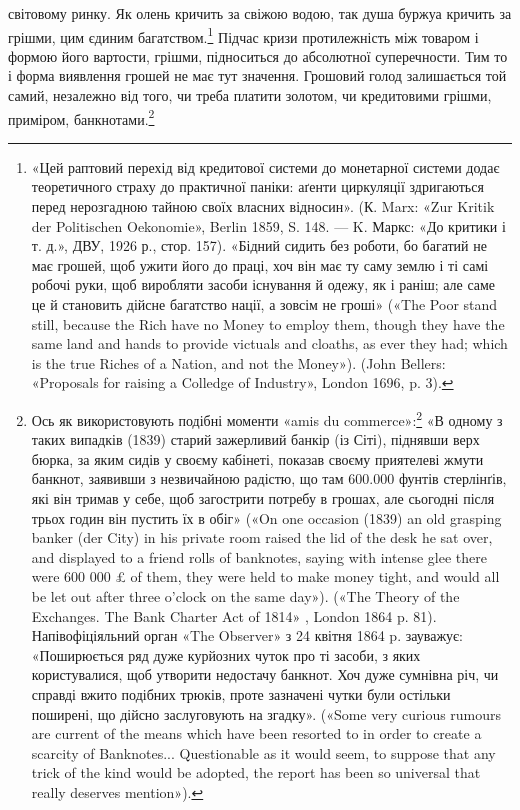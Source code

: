 \parcont{}  %
світовому ринку. Як олень кричить за свіжою водою, так душа буржуа кричить за грішми, цим єдиним
багатством.\footnote{
«Цей раптовий перехід від кредитової системи до монетарної системи додає теоретичного страху до
практичної паніки: аґенти циркуляції здригаються перед нерозгадною тайною своїх власних відносин».
(К. Marx: «Zur Kritik der Politischen Oekonomie», Berlin 1859, S. 148. — K. Маркс: «До критики і т.
д.», ДВУ, 1926 р., стор. 157). «Бідний сидить без роботи, бо багатий не має грошей, щоб ужити його
до праці, хоч він має ту саму землю і ті самі робочі руки, щоб виробляти засоби існування й одежу,
як і раніш; але саме це й становить дійсне багатство нації, а зовсім не гроші» («The Poor stand
still, because the Rich have no Money to employ them, though they have the same land and hands to
provide victuals and cloaths, as ever they had; which is the true Riches of a Nation, and not the
Money»). (John Bellers: «Proposals for raising a Colledge of
Industry», London 1696, p. 3).
} Підчас кризи протилежність між товаром і формою його вартости, грішми, підноситься до
абсолютної суперечности. Тим то і форма виявлення грошей не має тут значення. Грошовий голод
залишається той самий, незалежно від того, чи треба платити золотом, чи кредитовими грішми,
приміром, банкнотами.\footnote{
Ось як використовують подібні моменти «amis du commerce»:\footnote*{
— друзі торговлі. Ред.
} «В одному з таких випадків (1839)
старий зажерливий банкір (із Сіті), піднявши верх бюрка, за яким сидів у своєму кабінеті, показав
своєму приятелеві жмути банкнот, заявивши з незвичайною радістю, що там 600.000 фунтів стерлінґів,
які він тримав у себе, щоб загострити потребу в грошах, але сьогодні після трьох годин він пустить
їх в обіг» («On one occasion (1839) an old grasping banker (der City) in his private room raised the
lid of the desk he sat over, and displayed to a friend rolls of banknotes, saying with intense glee
there were 600 000 £ of them, they were held to make money tight, and would all be let out after
three o'clock on the same day»). («The Theory of the Exchanges. The Bank Charter Act of 1814» ,
London 1864 p. 81). Напівофіціяльний орган «The Observer» з 24 квітня 1864 p. зауважує: «Поширюється
ряд дуже курйозних чуток про ті засоби, з яких користувалися, щоб утворити недостачу банкнот. Хоч
дуже сумнівна річ, чи справді вжито подібних трюків, проте зазначені чутки були остільки поширені,
що дійсно заслуговують на згадку». («Some very curious rumours are current of the means which have
been resorted to in order to create a scarcity of Banknotes... Questionable as it would seem, to
suppose that any trick of the kind would be adopted, the report has been so universal that really
deserves mention»).
}

